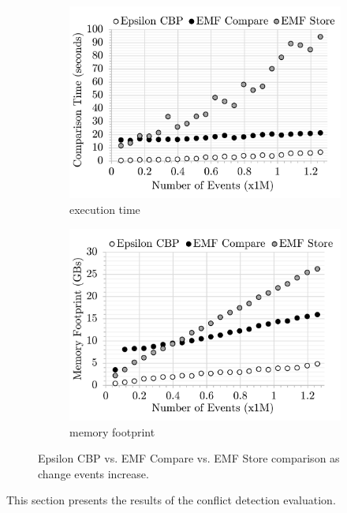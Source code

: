 \begin{figure}[ht]
\begin{subfigure}[t]{0.245\linewidth}
        \includegraphics[width=\linewidth]{conflict-time-events}
        \caption{execution time}
        \label{fig:conflict-time-events}
    \end{subfigure}
    \hfill
    \begin{subfigure}[t]{0.245\linewidth}
        \includegraphics[width=\linewidth]{conflict-memory-events}
        \caption{memory footprint}
        \label{fig:conflict-memory-events}
    \end{subfigure}
    \caption{Epsilon CBP vs. EMF Compare vs. EMF Store comparison as change events increase.}
    \label{fig:conflict_events}
\end{figure}

This section presents the results of the conflict detection evaluation. 

